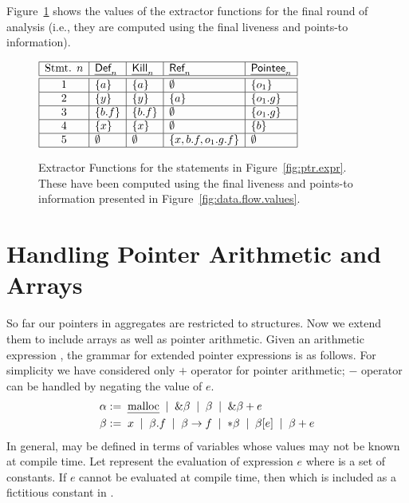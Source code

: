 \documentclass[a4paper,11pt,fleqn]{article}
\newcommand{\expr}{\text{\sf\em E\/}\xspace}
\newcommand{\const}{\text{\sf\em C\/}\xspace}
\newcommand{\Def}{\text{{\sf\em Def}}\xspace}
\newcommand{\Pointee}{\text{{\sf\em Pointee}}\xspace}
\newcommand{\Kill}{\text{{\sf\em Kill}}\xspace}
\newcommand{\Ref}{\text{{\sf\em Ref}}\xspace}
\newcommand{\eval}[1]{\text{$\llbracket{#1}\rrbracket$}}
\begin{document}
Figure~\ref{fig:extractor.fn.exmp} shows the values of the extractor functions for the final round of analysis
(i.e., they are computed using the final liveness and points-to information).

\begin{figure}[t]
\begin{center}
$
\begin{array}{|c|l|l|l|l|}
\hline
\text{Stmt. $n$}
	& \Def_n
	& \Kill_n
	& \Ref_n
	& \Pointee_n
	\\ \hline\hline
1
	& \{ a \} 
	& \{ a \} 
	& \emptyset
	& \{ o_1 \}
	\\ \hline
2 
	& \{ y \} 
	& \{ y \} 
	& \{ a \} 
	& \{ o_1.g \} 
	\\ \hline
3 
	& \{ b.f \} 
	& \{ b.f \} 
	& \emptyset
	& \{ o_1.g \}
	\\ \hline
4 
	& \{ x \} 
	& \{ x \} 
	& \emptyset 
	& \{ b \}
	\\ \hline
5 
	& \emptyset 
	& \emptyset 
	& \{ x,b.f, o_1.g.f \} 
	& \emptyset
	\\ \hline
\end{array}
$
\end{center}

\caption{Extractor Functions for the statements in
Figure~\protect\ref{fig:ptr.expr}. These have been computed using the final
liveness and points-to information presented in 
Figure~\protect\ref{fig:data.flow.values}.}
\label{fig:extractor.fn.exmp}
\end{figure}

\section{Handling Pointer Arithmetic and Arrays}
\label{sec:lfcpa.arrays}

So far our pointers in aggregates are restricted to structures. Now we
extend them to include arrays as well as pointer arithmetic. Given an
arithmetic expression \text{$e \in \expr$}, the grammar for extended
pointer expressions is as follows. For simplicity we have considered only
$+$ operator for pointer arithmetic; $-$ operator can be handled by negating the
value of $e$.
\begin{align}
\alpha & :=
	\; \text{\em malloc\/}
	\;\mid\; \&\beta
	\;\mid\; \beta
       \;\mid\; \&\beta + e
	\\
\beta & :=  
       \; x 
       \;\mid\; \beta.f 
       \;\mid\; \beta\rightarrow f 
       \;\mid\; *\beta  
       \;\mid\; \beta[e]
       \;\mid\; \beta + e
\end{align}
In general, \text{$e \in \expr$} may be defined in terms of variables whose values may
not be known at compile time.
Let \text{$\eval{e} \in \const$} represent the evaluation of
expression $e$ where \const is a set of constants. If $e$ cannot be evaluated at compile time,  then
\text{$\eval{e} = \bot_{\eval{}}$} which
is included as a fictitious constant in \const. 
\end{document}
